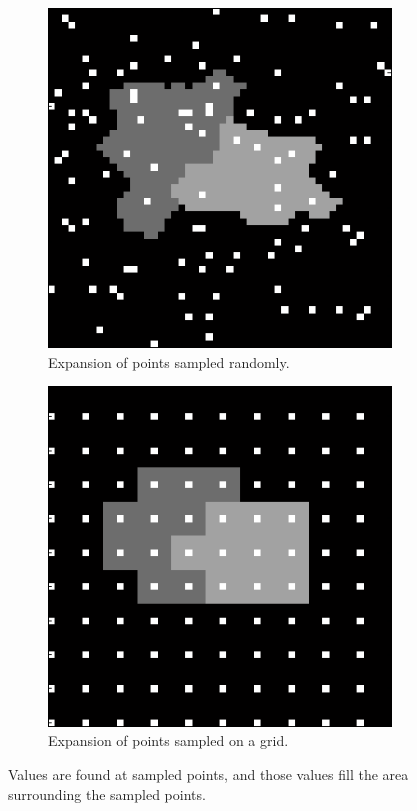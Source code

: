 \documentclass[english]{article}\usepackage[]{graphicx}\usepackage[]{color}
\begin{document}
\begin{figure}[h]
\centering
\begin{subfigure}{.3\textwidth}
  \centering
    \includegraphics[width=1\linewidth]{figures/randompointexpansion}
  \caption{Expansion of points sampled randomly.}
  \label{fig:randexp}
\end{subfigure}%
\hspace{30pt}
\begin{subfigure}{.3\textwidth}
  \centering
    \includegraphics[width=1\linewidth]{figures/gridpointexpansion}
  \caption{Expansion of points sampled on a grid.}
  \label{fig:gridexp}
\end{subfigure}
\caption{Values are found at sampled points, and those values fill the area surrounding the sampled points.}
\label{fig:sampleexp}
\end{figure}
\end{document}
